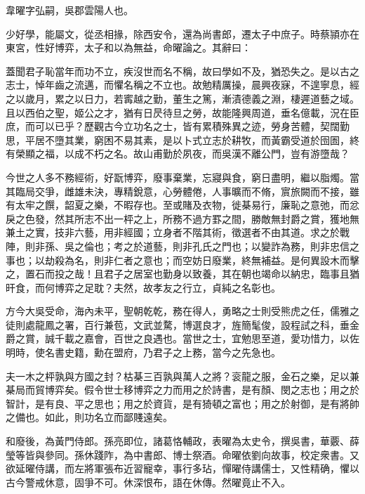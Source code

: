 \begin{pinyinscope}
 
 
 韋曜字弘嗣，吳郡雲陽人也。
 
 
 少好學，能屬文，從丞相掾，除西安令，還為尚書郎，遷太子中庶子。時蔡頴亦在東宮，性好博弈，太子和以為無益，命曜論之。其辭曰：
 
 
 
 
 蓋聞君子恥當年而功不立，疾沒世而名不稱，故曰學如不及，猶恐失之。是以古之志士，悼年齒之流邁，而懼名稱之不立也。故勉精厲操，晨興夜寐，不遑寧息，經之以歲月，累之以日力，若寗越之勤，董生之篤，漸漬德義之淵，棲遲道藝之域。且以西伯之聖，姬公之才，猶有日昃待旦之勞，故能隆興周道，垂名億載，況在臣庶，而可以已乎？歷觀古今立功名之士，皆有累積殊異之迹，勞身苦體，契闊勤思，平居不墮其業，窮困不易其素，是以卜式立志於耕牧，而黃霸受道於囹圄，終有榮顯之福，以成不朽之名。故山甫勤於夙夜，而吳漢不離公門，豈有游墮哉？
 
 
 
 
 今世之人多不務經術，好翫博弈，廢事棄業，忘寢與食，窮日盡明，繼以脂燭。當其臨局交爭，雌雄未決，專精銳意，心勞體倦，人事曠而不脩，賔旅闕而不接，雖有太牢之饌，韶夏之樂，不暇存也。至或賭及衣物，徙棊易行，廉恥之意弛，而忿戾之色發，然其所志不出一枰之上，所務不過方罫之間，勝敵無封爵之賞，獲地無兼土之實，技非六藝，用非經國；立身者不階其術，徵選者不由其道。求之於戰陣，則非孫、吳之倫也；考之於道藝，則非孔氏之門也；以變詐為務，則非忠信之事也；以劫殺為名，則非仁者之意也；而空妨日廢業，終無補益。是何異設木而擊之，置石而投之哉！且君子之居室也勤身以致養，其在朝也竭命以納忠，臨事且猶旰食，而何博弈之足耽？夫然，故孝友之行立，貞純之名彰也。
 
 
 
 
 方今大吳受命，海內未平，聖朝乾乾，務在得人，勇略之士則受熊虎之任，儒雅之徒則處龍鳳之署，百行兼苞，文武並騖，博選良才，旌簡髦俊，設程試之科，垂金爵之賞，誠千載之嘉會，百世之良遇也。當世之士，宜勉思至道，愛功惜力，以佐明時，使名書史籍，勳在盟府，乃君子之上務，當今之先急也。
 
 
 
 
 夫一木之枰孰與方國之封？枯棊三百孰與萬人之將？衮龍之服，金石之樂，足以兼棊局而貿博弈矣。假令世士移博弈之力而用之於詩書，是有顏、閔之志也；用之於智計，是有良、平之思也；用之於資貨，是有猗頓之富也；用之於射御，是有將帥之備也。如此，則功名立而鄙賤遠矣。
 
 
 
 
 和廢後，為黃門侍郎。孫亮即位，諸葛恪輔政，表曜為太史令，撰吳書，華覈、薛瑩等皆與參同。孫休踐阼，為中書郎、博士祭酒。命曜依劉向故事，校定衆書。又欲延曜侍講，而左將軍張布近習寵幸，事行多玷，憚曜侍講儒士，又性精确，懼以古今警戒休意，固爭不可。休深恨布，語在休傳。然曜竟止不入。
 

\end{pinyinscope}
